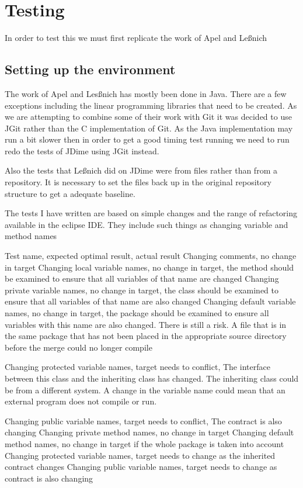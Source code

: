 
\chapter{Testing}
In order to test this we must first replicate the work of Apel and Le{\ss}nich

\section{Setting up the environment}
The work of Apel and Les{\ss}nich has mostly been done in Java.  There are a few exceptions including the linear programming libraries that need to be created.  As we are attempting to combine some of their work with Git it was decided to use JGit rather than the C implementation of Git. As the Java implementation may run a bit slower then in order to get a good timing test running we need to run redo the tests of JDime using JGit instead. 

Also the tests that Le{\ss}nich did on JDime were from files rather than from a repository. It is necessary to set the files back up in the original repository structure to get a adequate baseline.

The tests I have written are based on simple changes and the range of refactoring available in the eclipse IDE.  They include such things as changing variable and method names 

Test name, expected optimal result, actual result
Changing comments, no change in target
Changing local variable names, no change in target, the method should be examined to ensure that all variables of that name are changed
Changing private variable names, no change in target,  the class should be examined to ensure that all variables of that name are also changed
Changing default variable names, no change in target, the  package should be examined to ensure all variables with this name are also changed. There is still a risk. A file that is in the same package that has not been placed in the appropriate source directory before the merge could no longer compile
 
Changing protected variable names, target needs to conflict, The interface between this class and the inheriting class has changed.  The inheriting class could be from a different system.  A change in the variable name could mean that an external program does not compile or run.

Changing public variable names, target needs to conflict, The contract is also changing
Changing private method names, no change in target
Changing default method names, no change in target if the whole package is taken into account
Changing protected variable names, target needs to change as the inherited contract changes
Changing public variable names, target needs to change as contract is also changing 
